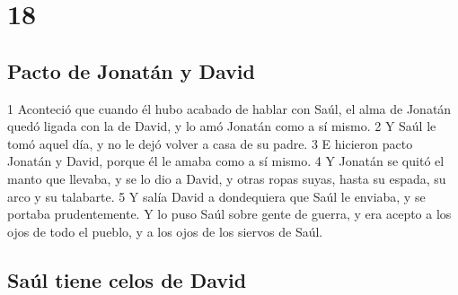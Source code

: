\chapter{18}

\section*{Pacto de Jonatán y David}


1 Aconteció que cuando él hubo acabado de hablar con Saúl, el alma de Jonatán quedó ligada con la de David, y lo amó Jonatán como a sí mismo.
2 Y Saúl le tomó aquel día, y no le dejó volver a casa de su padre.
3 E hicieron pacto Jonatán y David, porque él le amaba como a sí mismo.
4 Y Jonatán se quitó el manto que llevaba, y se lo dio a David, y otras ropas suyas, hasta su espada, su arco y su talabarte.
5 Y salía David a dondequiera que Saúl le enviaba, y se portaba prudentemente. Y lo puso Saúl sobre gente de guerra, y era acepto a los ojos de todo el pueblo, y a los ojos de los siervos de Saúl.
\section*{Saúl tiene celos de David}

